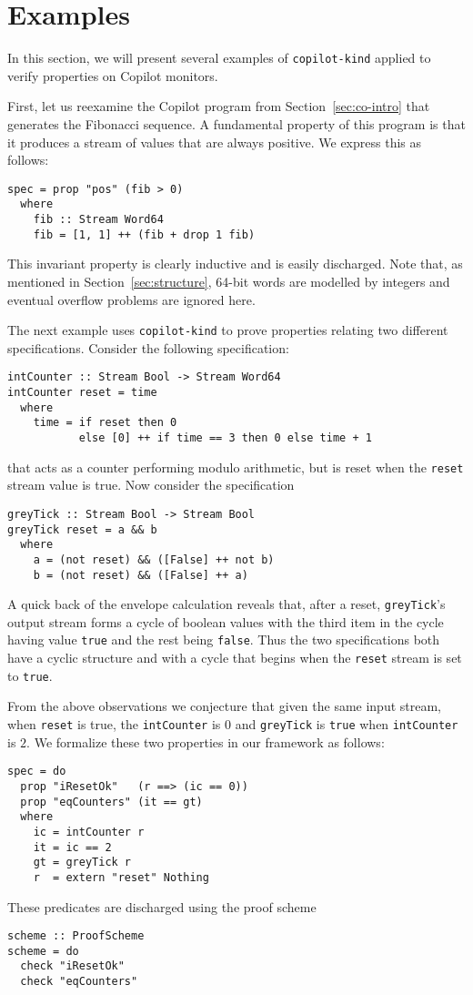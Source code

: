 \section{Examples}\label{sec:example}

In this section,  we will present several examples of
\texttt{copilot-kind} applied to verify properties on Copilot
monitors.


 First, let us reexamine the Copilot program from
 Section~\ref{sec:co-intro} that generates the  Fibonacci
 sequence. A fundamental property of this program is that it produces
 a stream of values that are always positive. We express this as follows:
\begin{lstlisting}[frame=single]
spec = prop "pos" (fib > 0)
  where
    fib :: Stream Word64
    fib = [1, 1] ++ (fib + drop 1 fib)
\end{lstlisting}
This  invariant property is clearly inductive and is easily
discharged. Note that, as mentioned in Section~\ref{sec:structure}, 
64-bit words are modelled by integers and eventual overflow problems are ignored here.
 
The next example uses \texttt{copilot-kind} to prove properties
relating two different specifications. Consider the following
specification:
\begin{lstlisting}[frame=single]
intCounter :: Stream Bool -> Stream Word64
intCounter reset = time
  where 
    time = if reset then 0
           else [0] ++ if time == 3 then 0 else time + 1
\end{lstlisting}
that acts as a counter performing modulo arithmetic, but is
reset when the \texttt{reset} stream value is true.  Now consider the
specification
\begin{lstlisting}[frame=single]
greyTick :: Stream Bool -> Stream Bool
greyTick reset = a && b
  where
    a = (not reset) && ([False] ++ not b)
    b = (not reset) && ([False] ++ a)
\end{lstlisting}
A quick back of the envelope calculation reveals that,
after a reset, \texttt{greyTick}'s output stream forms a cycle of
boolean values with the third item in the cycle having value
\texttt{true} and the rest being \texttt{false}.  Thus the two
specifications both have a cyclic structure and with a cycle that
begins when the \texttt{reset} stream is set to \texttt{true}.  

From the above observations we 
conjecture that given the same input stream, when \texttt{reset} is
true,  the \texttt{intCounter} is $0$ and \texttt{greyTick} is
\texttt{true} when \texttt{intCounter} is $2.$ We formalize these two
properties in our framework as follows:
\begin{lstlisting}[frame=single]
spec = do
  prop "iResetOk"   (r ==> (ic == 0))
  prop "eqCounters" (it == gt)
  where
    ic = intCounter r
    it = ic == 2
    gt = greyTick r
    r  = extern "reset" Nothing
\end{lstlisting}
These predicates are discharged using the proof scheme
\begin{lstlisting}[frame=single]
scheme :: ProofScheme
scheme = do
  check "iResetOk"
  check "eqCounters"
\end{lstlisting}  
